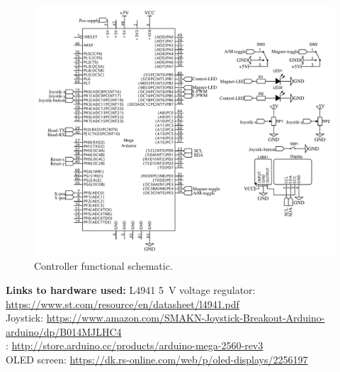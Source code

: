 \begin{figure}[H]
    \centering
    \includegraphics[width=1\textwidth]{pictures/Schematic_Kran_2022-02-16.pdf}
    \caption{Controller functional schematic.}
    \label{fig:controller_connections}
\end{figure}

\textbf{Links to hardware used:}\newline
L4941 \SI{5}{V} voltage regulator:\newline
\url{https://www.st.com/resource/en/datasheet/l4941.pdf}\\

Joystick:\newline
\url{https://www.amazon.com/SMAKN-Joystick-Breakout-Arduino-arduino/dp/B014MJLHC4}\\

\amega:\newline
\url{http://store.arduino.cc/products/arduino-mega-2560-rev3}\\

OLED screen:\newline
\url{https://dk.rs-online.com/web/p/oled-displays/2256197}